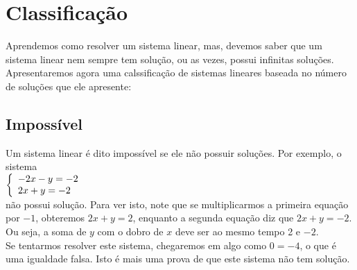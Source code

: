 \documentclass[a4paper,12pt]{article}
\begin{document}
  
\section{Classificação}
    Aprendemos como resolver um sistema linear, mas, devemos saber que um sistema linear nem sempre tem solução, ou as vezes, possui infinitas soluções. \\
    Apresentaremos agora uma calssificação de sistemas lineares baseada no número de soluções que ele apresente: \\
    \subsection{Impossível}
    Um sistema linear é dito impossível se ele não possuir soluções. Por exemplo, o sistema \\
   $ 
\left\{
\begin{array}{ll}
\displaystyle -2x -y = -2 \\
\displaystyle 2x + y = -2 \\
\end{array}
\right.\\
$
   \\
   não possui solução. Para ver isto, note que se multiplicarmos a primeira equação por $-1$, obteremos $2x + y = 2$, enquanto a segunda equação diz que $2x + y = -2$. Ou seja, a soma de $y$ com o dobro de $x$ deve ser ao mesmo tempo 2 e $-2$. \\
   Se tentarmos resolver este sistema, chegaremos em algo como $0 = -4$, o que é uma igualdade falsa. Isto é mais uma prova de que este sistema não tem solução.
   
\end{document}
